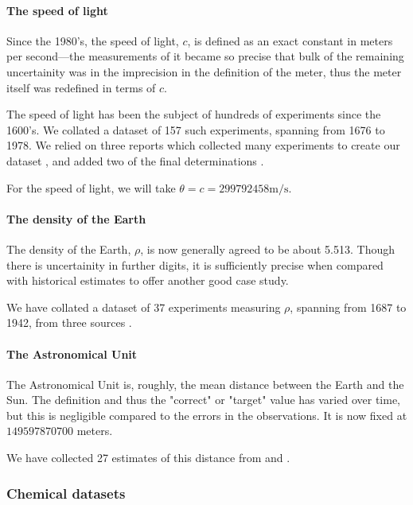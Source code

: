 \documentclass[12pt]{article}
\begin{document}
\paragraph{The speed of light}

Since the 1980's, the speed of light, $c$, is defined as an exact constant in meters per second---the measurements of it became so precise that bulk of the remaining uncertainity was in the imprecision in the definition of the meter, thus the meter itself was redefined in terms of $c$.

The speed of light has been the subject of hundreds of experiments since the 1600's. We collated a dataset of 157 such experiments, spanning from 1676 to 1978. We relied on three reports which collected many experiments to create our dataset \citep{birge1934velocity,froome1971velocity,raynaud2013determining}, and added two of the final determinations \citep{evenson1972speed,blaney1974measurement}.

For the speed of light, we will take $\theta=c=299792458\mathrm{m}/\mathrm{s}$.

\paragraph{The density of the Earth}

The density of the Earth, $\rho$, is now generally agreed to be about 5.513. Though there is uncertainity in further digits, it is sufficiently precise when compared with historical estimates to offer another good case study.

We have collated a dataset of 37 experiments measuring $\rho$, spanning from 1687 to 1942, from three sources \citep{burgess1902value,sagitov1970current,hughes2006mean}.

\paragraph{The Astronomical Unit}

The Astronomical Unit is, roughly, the mean distance between the Earth and the Sun. The definition and thus the "correct" or "target" value has varied over time, but this is negligible compared to the errors in the observations. It is now fixed at $149597870700$ meters.

We have collected 27 estimates of this distance from \citet{atkins1964determination} and \citet{standish2004astronomical}.

\subsubsection{Chemical datasets}
\end{document}
